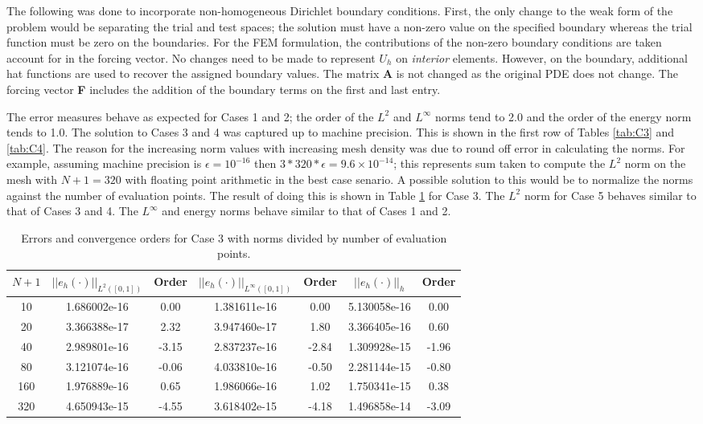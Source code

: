 \documentclass[a4paper, 12pt]{article}
\begin{document}
\noindent
The following was done to incorporate non-homogeneous Dirichlet boundary conditions.
First, the only change to the weak form of the problem would be separating the 
trial and test spaces; the solution must have a non-zero value on the specified 
boundary whereas the trial function must be zero on the boundaries.
For the FEM formulation, the contributions of the non-zero boundary
conditions are taken account for in the forcing vector. 
No changes need to be made to represent $U_h$ on \emph{interior} elements.
However, on the boundary, additional hat functions are used to recover the
assigned boundary values.
The matrix \textbf{A} is not changed as the original PDE does not change. 
The forcing vector \textbf{F} includes the addition of the boundary terms
on the first and last entry.

The error measures behave as expected for Cases 1 and 2; 
the order of the $L^2$ and $L^\infty$ norms tend to 2.0 
and the order of the energy norm tends to 1.0.
The solution to Cases 3 and 4 was captured up to machine precision.
This is shown in the first row of Tables \ref{tab:C3} and \ref{tab:C4}.
The reason for the increasing norm values with increasing mesh density 
was due to round off error in calculating the norms.
For example, assuming machine precision is $\epsilon = 10^{-16}$ 
then $3*320*\epsilon = 9.6 \times 10^{-14}$; this represents sum taken
to compute the $L^2$ norm on the mesh with $N+1=320$ with
floating point arithmetic in the best case senario.
A possible solution to this would be to normalize the norms 
against the number of evaluation points. 
The result of doing this is shown in Table \ref{tab:C3n} for Case 3.
The $L^2$ norm for Case 5 behaves similar to that of Cases 3 and 4.
The $L^\infty$ and energy norms behave similar to that of Cases 1 and 2.

\begin{table}[!ht]
\caption{Errors and convergence orders for Case 3 with norms divided by number of evaluation points.}
\vspace{0.1in}
\centering
\begin{tabular}{|c|c|c| c| c| c| c|}
\hline
 $N+1$&  $||e_h(\cdot)||_{L^2([0,1])}$ & Order  & $||e_h(\cdot)||_{L^\infty([0,1])}$ & Order& $||e_h(\cdot)||_h$& Order \\
 \hline
     10  & 1.686002e-16 & 0.00 & 1.381611e-16 &  0.00 & 5.130058e-16 &  0.00\\
     20  & 3.366388e-17 & 2.32 & 3.947460e-17 &  1.80 & 3.366405e-16 &  0.60\\
     40  & 2.989801e-16 &-3.15 & 2.837237e-16 & -2.84 & 1.309928e-15 & -1.96\\
     80  & 3.121074e-16 &-0.06 & 4.033810e-16 & -0.50 & 2.281144e-15 & -0.80\\
     160 & 1.976889e-16 & 0.65 & 1.986066e-16 &  1.02 & 1.750341e-15 &  0.38\\
     320 & 4.650943e-15 &-4.55 & 3.618402e-15 & -4.18 & 1.496858e-14 & -3.09\\
\hline
\end{tabular}
\label{tab:C3n}
\end{table}
\end{document}
